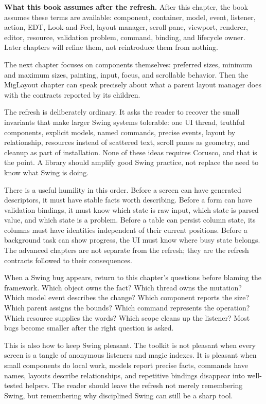 \textbf{What this book assumes after the refresh.} After this chapter, the book assumes these terms are available: component, container, model, event, listener, action, EDT, Look-and-Feel, layout manager, scroll pane, viewport, renderer, editor, resource, validation problem, command, binding, and lifecycle owner. Later chapters will refine them, not reintroduce them from nothing.

The next chapter focuses on components themselves: preferred sizes, minimum and maximum sizes, painting, input, focus, and scrollable behavior. Then the MigLayout chapter can speak precisely about what a parent layout manager does with the contracts reported by its children.

The refresh is deliberately ordinary. It asks the reader to recover the small invariants that make larger Swing systems tolerable: one UI thread, truthful components, explicit models, named commands, precise events, layout by relationship, resources instead of scattered text, scroll panes as geometry, and cleanup as part of installation. None of these ideas requires Corusco, and that is the point. A library should amplify good Swing practice, not replace the need to know what Swing is doing.

There is a useful humility in this order. Before a screen can have generated descriptors, it must have stable facts worth describing. Before a form can have validation bindings, it must know which state is raw input, which state is parsed value, and which state is a problem. Before a table can persist column state, its columns must have identities independent of their current positions. Before a background task can show progress, the UI must know where busy state belongs. The advanced chapters are not separate from the refresh; they are the refresh contracts followed to their consequences.

When a Swing bug appears, return to this chapter's questions before blaming the framework. Which object owns the fact? Which thread owns the mutation? Which model event describes the change? Which component reports the size? Which parent assigns the bounds? Which command represents the operation? Which resource supplies the words? Which scope cleans up the listener? Most bugs become smaller after the right question is asked.

This is also how to keep Swing pleasant. The toolkit is not pleasant when every screen is a tangle of anonymous listeners and magic indexes. It is pleasant when small components do local work, models report precise facts, commands have names, layouts describe relationships, and repetitive bindings disappear into well-tested helpers. The reader should leave the refresh not merely remembering Swing, but remembering why disciplined Swing can still be a sharp tool.

